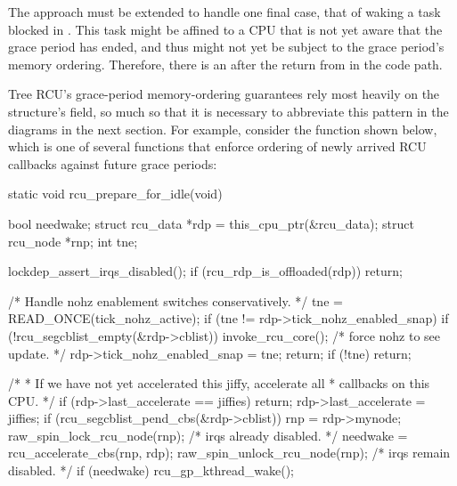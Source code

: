 The approach must be extended to handle one final case, that of waking a
task blocked in .
This task might be affined to
a CPU that is not yet aware that the grace period has ended, and thus
might not yet be subject to the grace period's memory ordering.
Therefore, there is an  after the return from
 in the  code path.

\QuickQuizEnd

Tree RCU's grace-period memory-ordering guarantees rely most heavily on
the  structure's  field, so much so that it is
necessary to abbreviate this pattern in the diagrams in the next
section.
For example, consider the  function
shown below, which is one of several functions that enforce ordering of
newly arrived RCU callbacks against future grace periods:

\begin{fcvlabel}
\begin{VerbatimN}[commandchars=\%\@\$]
	static void rcu_prepare_for_idle(void)
	{
		bool needwake;
		struct rcu_data *rdp = this_cpu_ptr(&rcu_data);
		struct rcu_node *rnp;
		int tne;

		lockdep_assert_irqs_disabled();
		if (rcu_rdp_is_offloaded(rdp))
			return;

		/* Handle nohz enablement switches conservatively. */
		tne = READ_ONCE(tick_nohz_active);
		if (tne != rdp->tick_nohz_enabled_snap) {
			if (!rcu_segcblist_empty(&rdp->cblist))
				invoke_rcu_core(); /* force nohz to see update. */
			rdp->tick_nohz_enabled_snap = tne;
			return;
		}
		if (!tne)
			return;

		/*
		 * If we have not yet accelerated this jiffy, accelerate all
		 * callbacks on this CPU.
		 */
		if (rdp->last_accelerate == jiffies)
			return;
		rdp->last_accelerate = jiffies;
		if (rcu_segcblist_pend_cbs(&rdp->cblist)) { %
			rnp = rdp->mynode;
			raw_spin_lock_rcu_node(rnp); /* irqs already disabled. */ %
			needwake = rcu_accelerate_cbs(rnp, rdp);
			raw_spin_unlock_rcu_node(rnp); /* irqs remain disabled. */
			if (needwake)
				rcu_gp_kthread_wake();
		}
	}
\end{VerbatimN}
\end{fcvlabel}

